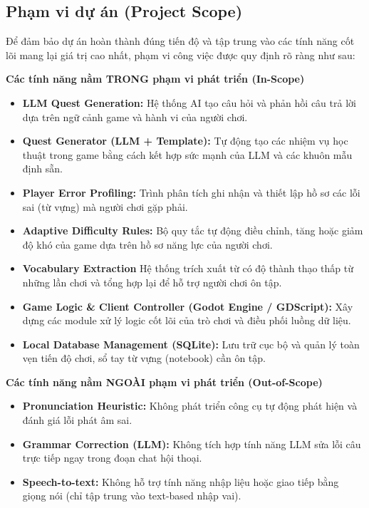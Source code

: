 \subsection{Phạm vi dự án (Project Scope)}
Để đảm bảo dự án hoàn thành đúng tiến độ và tập trung vào các tính năng cốt lõi mang lại giá trị cao nhất, phạm vi công việc được quy định rõ ràng như sau:

\vspace{0.2cm}
\noindent \textbf{Các tính năng nằm TRONG phạm vi phát triển (In-Scope)}
\begin{itemize}
    \item \textbf{LLM Quest Generation:} Hệ thống AI tạo câu hỏi và  phản hồi câu trả lời dựa trên ngữ cảnh game và hành vi của người chơi.
    \item \textbf{Quest Generator (LLM + Template):} Tự động tạo các nhiệm vụ học thuật trong game bằng cách kết hợp sức mạnh của LLM và các khuôn mẫu định sẵn.
    \item \textbf{Player Error Profiling:} Trình phân tích ghi nhận và thiết lập hồ sơ các lỗi sai (từ vựng) mà người chơi gặp phải.
    \item \textbf{Adaptive Difficulty Rules:} Bộ quy tắc tự động điều chỉnh, tăng hoặc giảm độ khó của game dựa trên hồ sơ năng lực của người chơi.
    \item \textbf{Vocabulary Extraction} Hệ thống trích xuất từ có độ thành thạo thấp từ những lần chơi và tổng hợp lại để hỗ trợ người chơi ôn tập.
    \item \textbf{Game Logic \& Client Controller (Godot Engine / GDScript):} Xây dựng các module xử lý logic cốt lõi của trò chơi và điều phối luồng dữ liệu.
    \item \textbf{Local Database Management (SQLite):} Lưu trữ cục bộ và quản lý toàn vẹn tiến độ chơi, sổ tay từ vựng (notebook) cần ôn tập.
\end{itemize}

\noindent \textbf{Các tính năng nằm NGOÀI phạm vi phát triển (Out-of-Scope)}
\begin{itemize}
    \item \textbf{Pronunciation Heuristic:} Không phát triển công cụ tự động phát hiện và đánh giá lỗi phát âm sai.
    \item \textbf{Grammar Correction (LLM):} Không tích hợp tính năng LLM sửa lỗi câu trực tiếp ngay trong đoạn chat hội thoại.
    \item \textbf{Speech-to-text:} Không hỗ trợ tính năng nhập liệu hoặc giao tiếp bằng giọng nói (chỉ tập trung vào text-based nhập vai).
\end{itemize}

